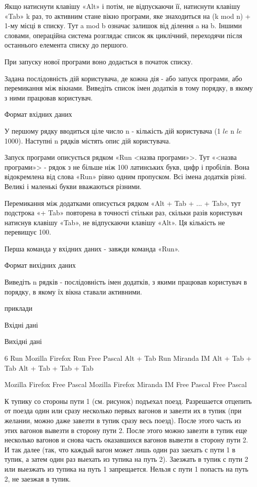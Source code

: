 \documentclass[]{article}
\begin{document}
\begin{enumerate}
Якщо натиснути клавішу «Alt» і потім, не відпускаючи її, натиснути клавішу «Tab» k раз, то активним стане вікно програми, яке знаходиться на (k mod n) + 1-му місці в списку. Тут a mod b означає залишок від ділення a на b. Іншими словами, операційна система розглядає список як циклічний, переходячи після останнього елемента списку до першого.

При запуску нової програми воно додається в початок списку.

Задана послідовність дій користувача, де кожна дія - або запуск програми, або перемикання між вікнами. Виведіть список імен додатків в тому порядку, в якому з ними працював користувач.

Формат вхідних даних

У першому рядку вводиться ціле число n - кількість дій користувача (1 $ le $ n $ le $ 1000). Наступні n рядків містять опис дій користувача.

Запуск програми описується рядком «Run <назва програми»>. Тут «<назва програми»> - рядок з не більше ніж 100 латинських букв, цифр і пробілів. Вона відокремлена від слова «Run» рівно одним пропуском. Всі імена додатків різні. Великі і маленькі букви вважаються різними.

Перемикання між додатками описується рядком «Alt + Tab + ... + Tab», тут подстрока «+ Tab» повторена в точності стільки раз, скільки разів користувач натиснув клавішу «Tab», не відпускаючи клавішу «Alt». Ця кількість не перевищує 100.

Перша команда у вхідних даних - завжди команда «Run».

Формат вихідних даних

Виведіть n рядків - послідовність імен додатків, з якими працював користувач в порядку, в якому їх вікна ставали активними.

приклади

Вхідні дані


Вихідні дані

 6
 Run Mozilla Firefox
 Run Free Pascal
 Alt + Tab
 Run Miranda IM
 Alt + Tab + Tab
 Alt + Tab + Tab + Tab



 Mozilla Firefox
 Free Pascal
 Mozilla Firefox
 Miranda IM
 Free Pascal
 Free Pascal 



К тупику со стороны пути 1 (см. рисунок) подъехал поезд. Разрешается отцепить от поезда один или сразу несколько первых вагонов и завезти их в тупик (при желании, можно даже завезти в тупик сразу весь поезд). После этого часть из этих вагонов вывезти в сторону пути 2. После этого можно завезти в тупик еще несколько вагонов и снова часть оказавшихся вагонов вывезти в сторону пути 2. И так далее (так, что каждый вагон может лишь один раз заехать с пути 1 в тупик, а затем один раз выехать из тупика на путь 2). Заезжать в тупик с пути 2 или выезжать из тупика на путь 1 запрещается. Нельзя с пути 1 попасть на путь 2, не заезжая в тупик.


\end{enumerate}
\end{document}
